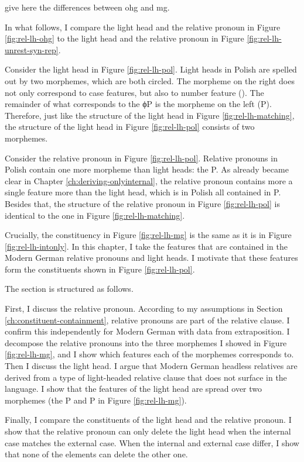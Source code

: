 give here the differences between ohg and mg.

In what follows, I compare the light head and the relative pronoun in Figure \ref{fig:rel-lh-ohg} to the light head and the relative pronoun in Figure \ref{fig:rel-lh-unrest-syn-rep}.

Consider the light head in Figure \ref{fig:rel-lh-pol}.
Light heads in Polish are spelled out by two morphemes, which are both circled. The morpheme on the right does not only correspond to case features, but also to number feature (). The remainder of what corresponds to the ϕP is the morpheme on the left (P).
Therefore, just like the structure of the light head in Figure \ref{fig:rel-lh-matching}, the structure of the light head in Figure \ref{fig:rel-lh-pol} consists of two morphemes.

Consider the relative pronoun in Figure \ref{fig:rel-lh-pol}.
Relative pronouns in Polish contain one more morpheme than light heads: the P. As already became clear in Chapter \ref{ch:deriving-onlyinternal}, the relative pronoun contains more a single feature more than the light head, which is in Polish all contained in P. Besides that, the structure of the relative pronoun in Figure \ref{fig:rel-lh-pol} is identical to the one in Figure \ref{fig:rel-lh-matching}.

Crucially, the constituency in Figure \ref{fig:rel-lh-mg} is the same as it is in Figure \ref{fig:rel-lh-intonly}. In this chapter, I take the features that are contained in the Modern German relative pronouns and light heads. I motivate that these features form the constituents shown in Figure \ref{fig:rel-lh-pol}.

The section is structured as follows.

First, I discuss the relative pronoun. According to my assumptions in Section \ref{ch:constituent-containment}, relative pronouns are part of the relative clause. I confirm this independently for Modern German with data from extraposition. I decompose the relative pronouns into the three morphemes I showed in Figure \ref{fig:rel-lh-mg}, and I show which features each of the morphemes corresponds to.
Then I discuss the light head. I argue that Modern German headless relatives are derived from a type of light-headed relative clause that does not surface in the language. I show that the features of the light head are spread over two morphemes (the P and P in Figure \ref{fig:rel-lh-mg}).

Finally, I compare the constituents of the light head and the relative pronoun. I show that the relative pronoun can only delete the light head when the internal case matches the external case. When the internal and external case differ, I show that none of the elements can delete the other one.





